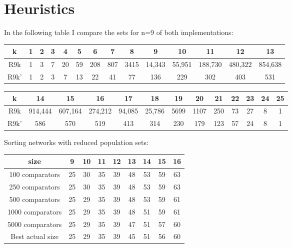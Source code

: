 \documentclass[../main.tex]{subfiles}
\begin{document}
	\section{Heuristics}
	In the following table I compare the sets for n=9 of both implementations:
	\begin{center}
		\begin{tabular}{||c c c c c c c c c c c c c c||} 
			\hline
			k & 1 & 2 & 3 & 4 & 5 & 6 & 7 & 8 & 9 & 10 & 11 & 12 & 13  \\ [0.5ex] 
			\hline\hline
			R9k& 1 & 3 & 7 & 20 & 59 & 208 & 807 & 3415 & 14,343 & 55,951 & 188,730 & 480,322 & 854,638 \\ 
			\hline
			R9k' & 1 & 2 & 3 & 7 & 13 & 22 & 41 & 77 & 136 & 229 & 302 & 403 & 531 \\  [1ex] 
			\hline
		\end{tabular}
	\end{center}
	\begin{center}
		\begin{tabular}{|c c c c c c c c c c c c c|} 
			\hline
			k & 14 & 15 & 16 & 17 & 18 & 19 & 20 & 21 & 22 & 23 & 24 & 25  \\ [0.5ex] 
			\hline\hline
			R9k & 914,444 & 607,164 & 274,212 & 94,085 & 25,786 & 5699 & 1107 & 250 & 73 & 27 & 8 & 1 \\ 
			\hline
			R9k' & 586 & 570 & 519 & 413 & 314 & 230 & 179 & 123 & 57 & 24 & 8 & 1 \\  [1ex] 
			\hline
		\end{tabular}
	\end{center}
	
	Sorting networks with reduced population sets:
	\begin{center}
		\begin{tabular}{|c | c c c c c c c c|} 
			\hline
			size & 9 & 10 & 11 & 12 & 13 & 14 & 15 & 16  \\ [0.5ex] 
			\hline\hline
			100 comparators & 25 & 30 & 35 & 39 & 48 & 53 & 59 & 63 \\ [1ex]
			\hline
			250 comparators  & 25 & 30 & 35 & 39 & 48 & 53 & 59 & 63 \\  [1ex] 
			\hline
			500 comparators & 25 & 29 & 35 & 39 & 48 & 53 & 59 & 61 \\  [1ex] 
			\hline
			1000 comparators & 25 & 29 & 35 & 39 & 48 & 51 & 59 & 61 \\  [1ex] 
			\hline
			5000 comparators & 25 & 29 & 35 & 39 & 47 & 51 & 57 & 60 \\  [1ex] 
			\hline
			Best actual size & 25 & 29 & 35 & 39 & 45 & 51 & 56 & 60 \\  [1ex] 
			\hline
		\end{tabular}
	\end{center}
	
\end{document}

